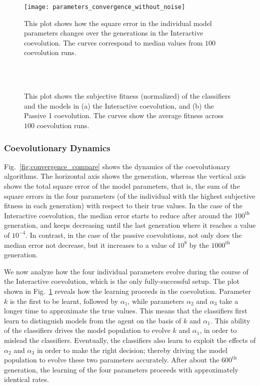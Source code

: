 \begin{figure}[!t]%
	   \centering
	   \texttt{[image: parameters\_convergence\_without\_noise]}
	    \caption{This plot shows how the square error in the individual model parameters
	    changes over the generations in the Interactive coevolution. The curves correspond to median values from $100$ coevolution runs.\label{fig:parameters_convergence}}
\end{figure}

\begin{figure}[!t]%
	\centering
		\\
		\\
		\caption{This plot shows the subjective fitness (normalized) of the classifiers and
		the models in (a) the Interactive coevolution, and (b) the Passive 1 coevolution.
		The curves show the average fitness across $100$ coevolution runs.\label{fig:fitness_dynamics}}
\end{figure}

\subsubsection{Coevolutionary Dynamics}

Fig.~\ref{fig:convergence_compare} shows the dynamics of the coevolutionary algorithms. The horizontal axis shows the generation, whereas the vertical axis shows the total square error of the model parameters, that is, the sum of the square errors in the four parameters (of the individual with the highest subjective fitness in each generation) with respect to their true values. In the case of the Interactive coevolution, the median error starts to reduce after around the $100^\textrm{th}$ generation,  and keeps decreasing until the last generation where it reaches a value of $10^{-4}$. In contrast, in the case of the passive coevolutions, not only does the median error not decrease, but it increases to a value of $10^{8}$ by the $1000^\textrm{th}$ generation.

We now analyze how the four individual parameters evolve during the course of the Interactive coevolution, which is the only fully-successful setup. The plot shown in Fig.~\ref{fig:parameters_convergence} reveals how the learning proceeds in the coevolution. Parameter $k$ is the first to be learnt, followed by $\alpha_1$, while parameters $\alpha_2$ and $\alpha_3$ take a longer time to approximate the true values. This means that the classifiers first learn to distinguish models from the agent on the basis of $k$ and $\alpha_1$. This ability of the classifiers drives the model population to evolve $k$ and $\alpha_1$, in order to mislead the classifiers. Eventually, the classifiers also learn to exploit the effects of $\alpha_2$ and $\alpha_3$ in order to make the right decision; thereby driving the model population to evolve these two parameters accurately. After about the $600^\textrm{th}$ generation, the learning of the four parameters proceeds with approximately identical rates.


